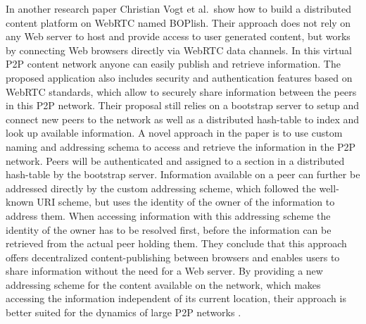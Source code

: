 In another research paper Christian Vogt et al.\ show how to build a distributed content platform on \gls{WebRTC} named BOPlish. Their approach does not rely on any Web server to host and provide access to user generated content, but works by connecting Web browsers directly via \gls{WebRTC} data channels. In this virtual \gls{P2P} content network anyone can easily publish and retrieve information. The proposed application also includes security and authentication features based on \gls{WebRTC} standards, which allow to securely share information between the peers in this \gls{P2P} network. Their proposal still relies on a bootstrap server to setup and connect new peers to the network as well as a distributed hash-table to index and look up available information. A novel approach in the paper is to use custom naming and addressing schema to access and retrieve the information in the \gls{P2P} network. Peers will be authenticated and assigned to a section in a distributed hash-table by the bootstrap server. Information available on a peer can further be addressed directly by the custom addressing scheme, which followed the well-known \gls{URI} scheme, but uses the identity of the owner of the information to address them. When accessing information with this addressing scheme the identity of the owner has to be resolved first, before the information can be retrieved from the actual peer holding them. They conclude that this approach offers decentralized content-publishing between browsers and enables users to share information without the need for a Web server. By providing a new addressing scheme for the content available on the network, which makes accessing the information independent of its current location, their approach is better suited for the dynamics of large \gls{P2P} networks \citep{vogt2013content}. \\

